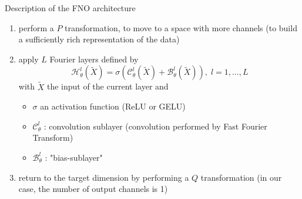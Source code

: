 \documentclass[compress,10pt,xcolor={table,dvipsnames},t]{beamer}
\begin{document}
	\begin{frame}{Description of the FNO architecture}
		\begin{center}
			\centering
		\end{center}
		\begin{enumerate}[\ding{217}]
			\item perform a $P$ transformation, to move to a space with more channels (to build a sufficiently rich representation of the data)
			\item apply $L$ Fourier layers defined by
			$$\mathcal{H}_\theta^l(\tilde{X})=\sigma\left(\mathcal{C}_\theta^l(\tilde{X})+\mathcal{B}_\theta^l(\tilde{X})\right),\; l=1,\dots,L$$
			with $\tilde{X}$ the input of the current layer and
			\begin{itemize}
				\item $\sigma$ an activation function (ReLU or GELU)
				\item $\mathcal{C}_\theta^l$ : convolution sublayer (convolution performed by Fast Fourier Transform)
				\item $\mathcal{B}_\theta^l$ : "bias-sublayer"
			\end{itemize}
			\item return to the target dimension by performing a $Q$ transformation (in our case, the number of output channels is 1)
		\end{enumerate}
	\end{frame}
\end{document}
